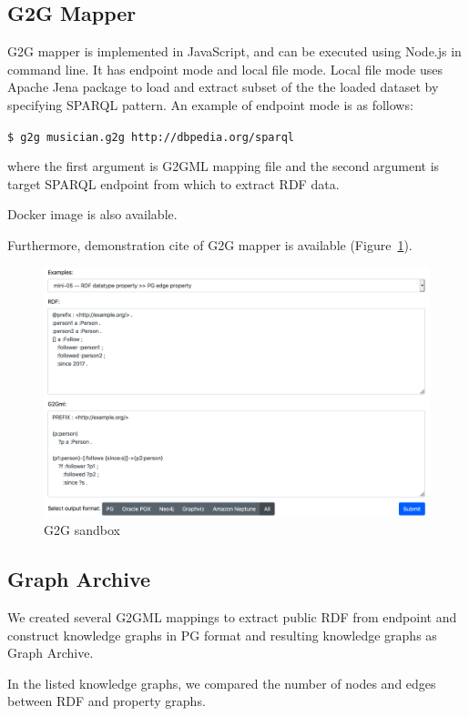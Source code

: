 \documentclass[runningheads]{llncs}
\begin{document}
\subsection{G2G Mapper}

G2G mapper is implemented in JavaScript, and can be executed using Node.js in command line. It has endpoint mode and local file mode. Local file mode uses Apache Jena package to load and extract subset of the the loaded dataset by specifying SPARQL pattern. An example of endpoint mode is as follows:

\texttt{\$ g2g musician.g2g http://dbpedia.org/sparql}

\noindent where the first argument is G2GML mapping file and the second argument is target SPARQL endpoint from which to extract RDF data.

Docker image is also available.

Furthermore, demonstration cite of G2G mapper is available (Figure~\ref{fig:sandbox}).

\begin{figure}
\center
\includegraphics[width=1.0\textwidth]{sandbox.png}
\caption{G2G sandbox}
\label{fig:sandbox}
\end{figure}

\subsection{Graph Archive}
We created several G2GML mappings to extract public RDF from endpoint and construct knowledge graphs in PG format and resulting knowledge graphs as Graph Archive.

In the listed knowledge graphs, we compared the number of nodes and edges between RDF and property graphs.
\end{document}

